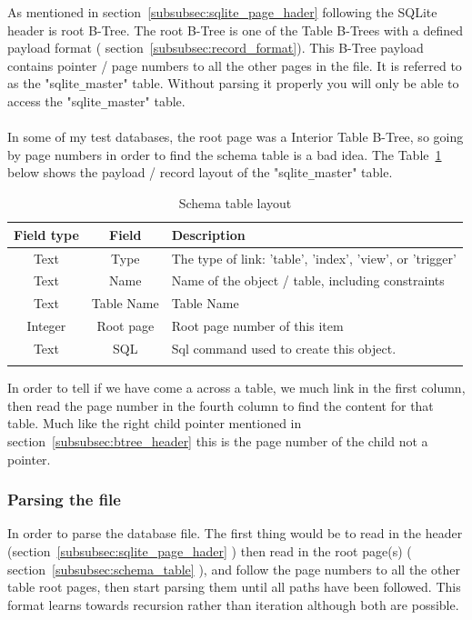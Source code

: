 As mentioned in section~\ref{subsubsec:sqlite_page_hader} following the SQLite header is root B-Tree. The root B-Tree is one of the Table B-Trees with a defined payload format ( section~\ref{subsubsec:record_format}). This B-Tree payload contains pointer / page numbers to all the other pages in the file. It is referred to as the "sqlite\verb|_|master" table. Without parsing it properly you will only be able to access the "sqlite\verb|_|master" table.
\\\\
In some of my test databases, the root page was a Interior Table B-Tree, so going by page numbers in order to find the schema table is a bad idea. The Table~\ref{tbl:schema_table} below shows the payload / record layout of the "sqlite\verb|_|master" table.

\begin{longtable}[h]{| c | c| p{10cm} |}
		\hline
			\textbf{Field type} & \textbf{Field} & \textbf{Description} \\ 
		\hline
		\endhead
			Text & Type & The type of link: 'table', 'index', 'view', or 'trigger' \\
		\hline
			Text & Name & Name of the object / table, including constraints \\
		\hline
			Text & Table Name & Table Name \\
		\hline
			Integer & Root page & Root page number of this item \\
		\hline
			Text & SQL & Sql command used to create this object. \\
		\hline
	\caption{Schema table layout}
	\label{tbl:schema_table}
\end{longtable}

In order to tell if we have come a across a table, we much link in the first column, then read the page number in the fourth column to find the content for that table. Much like the right child pointer mentioned in section~\ref{subsubsec:btree_header} this is the page number of the child not a pointer.

\subsubsection{Parsing the file}
\label{subsubsec:parsing the file}

In order to parse the database file. The first thing would be to read in the header (section~\ref{subsubsec:sqlite_page_hader} ) then read in the root page(s) ( section~\ref{subsubsec:schema_table} ), and follow the page numbers to all the other table root pages, then start parsing them until all paths have been followed. This format learns towards recursion rather than iteration although both are possible.
